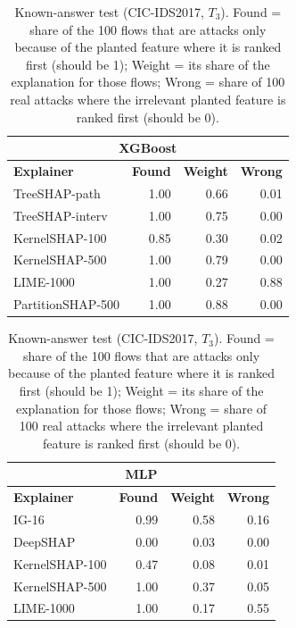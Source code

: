 \begin{table}[!htbp]
\centering
\caption{Known-answer test (CIC-IDS2017, $T_3$). Found = share of the 100 flows that are attacks only because of the planted feature where it is ranked first (should be 1); Weight = its share of the explanation for those flows; Wrong = share of 100 real attacks where the irrelevant planted feature is ranked first (should be 0).}
\label{tab:sanity}
\scriptsize
\setlength{\tabcolsep}{5pt}
\begin{minipage}[t]{0.495\textwidth}
\centering
\begin{tabular}{lrrr}
\toprule
\multicolumn{4}{c}{\textbf{XGBoost}} \\
\midrule
\textbf{Explainer} & \textbf{Found} & \textbf{Weight} & \textbf{Wrong} \\
\midrule
TreeSHAP-path & 1.00 & 0.66 & 0.01 \\
TreeSHAP-interv & 1.00 & 0.75 & 0.00 \\
KernelSHAP-100 & 0.85 & 0.30 & 0.02 \\
KernelSHAP-500 & 1.00 & 0.79 & 0.00 \\
LIME-1000 & 1.00 & 0.27 & 0.88 \\
PartitionSHAP-500 & 1.00 & 0.88 & 0.00 \\
\bottomrule
\end{tabular}
\end{minipage}
\hfill
\begin{minipage}[t]{0.495\textwidth}
\centering
\begin{tabular}{lrrr}
\toprule
\multicolumn{4}{c}{\textbf{MLP}} \\
\midrule
\textbf{Explainer} & \textbf{Found} & \textbf{Weight} & \textbf{Wrong} \\
\midrule
IG-16 & 0.99 & 0.58 & 0.16 \\
DeepSHAP & 0.00 & 0.03 & 0.00 \\
KernelSHAP-100 & 0.47 & 0.08 & 0.01 \\
KernelSHAP-500 & 1.00 & 0.37 & 0.05 \\
LIME-1000 & 1.00 & 0.17 & 0.55 \\
\bottomrule
\end{tabular}
\end{minipage}
\end{table}
